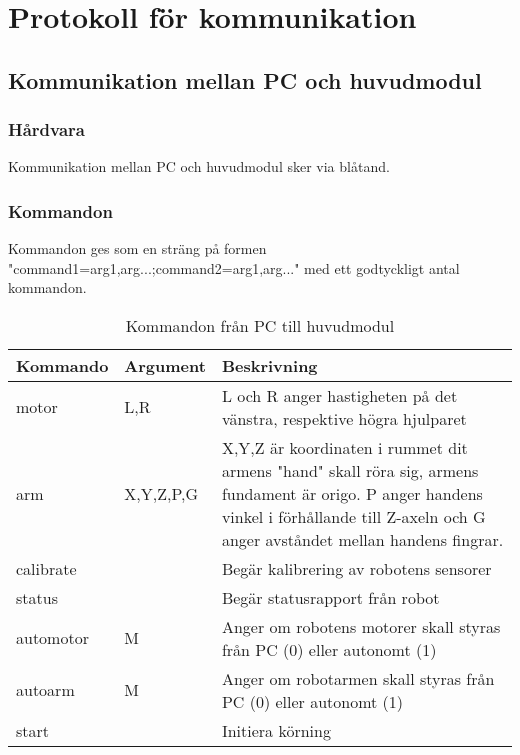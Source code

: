 \section{Protokoll för kommunikation}

\subsection{Kommunikation mellan PC och huvudmodul}

\subsubsection{Hårdvara}
Kommunikation mellan PC och huvudmodul sker via blåtand.

\subsubsection{Kommandon}
Kommandon ges som en sträng på formen "command1=arg1,arg...;command2=arg1,arg..." med ett godtyckligt antal kommandon. \\

\begin{table}[h]
	\centering
		\begin{tabularx}{\textwidth}{| l | l | X |}
			\hline
			\textbf{Kommando} & \textbf{Argument} & \textbf{Beskrivning} \\
			\hline
			{motor} & {L,R} & {L och R anger hastigheten på det vänstra, respektive högra hjulparet} \\
			\hline
			{arm} & {X,Y,Z,P,G} & {X,Y,Z är koordinaten i rummet dit armens "hand" skall röra sig, armens fundament är origo. P anger handens vinkel i förhållande till Z-axeln och G anger avståndet mellan handens fingrar.} \\
			\hline
			{calibrate} & {} & {Begär kalibrering av robotens sensorer} \\
			\hline
			{status} & {} & {Begär statusrapport från robot \todo{Format på svar?}} \\
			\hline
			{automotor} & {M} & {Anger om robotens motorer skall styras från PC (0) eller autonomt (1)} \\
			\hline
			{autoarm} & {M} & {Anger om robotarmen skall styras från PC (0) eller autonomt (1)} \\
			\hline
			{start} & {} & {Initiera körning} \\
			\hline
		\end{tabularx}
	\caption{Kommandon från PC till huvudmodul} \label{protokoll:pc-huvud}
\end{table}
 \\
\\


